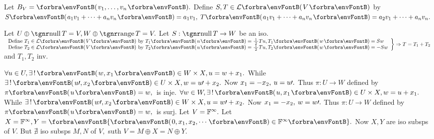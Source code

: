 Let $B_V=\Par{v_1,\dots,v_n}.$ \parSol{}
Define $S,T\in\Lm{V}$ by $S\Par{a_1 v_1+\dots+a_n v_n}=a_1 v_1,\;T\Par{a_1 v_1+\dots+a_n v_n}=a_2 v_1+\dots+a_n v_n.$\PfEnd
\SepLine

Let $U\oplus\null T=V,W\oplus\range T=V.$ Let $S:\null T\rightarrow W$ be an iso.\parSol{}
\hspace{-6pt}$\MathRightBrace{l}{$Define $T_1\in\Lm{V}$ by $T_1\Par{u}=\frac{\;1\;}{2}Tu,T_1\Par{w}=Sw\\$Define $T_2\in\Lm{V}$ by $T_2\Par{u}=\frac{\;1\;}{2}Tu,T_2\Par{w}=-Sw}\Rightarrow T=T_1+T_2$ and $T_1,T_2$ inv.\PfEnd
\SepLine

$\forall u\in U,\exists\,!\,\Par{w,x_1}\in W\times X,u=w+x_1.$ While $\exists\,!\,\Par{u\apostrophe,x_2}\in U\times X,w=u\apostrophe+x_2.$\parSol{}
Now $x_1=-x_2,\:u=u\prime.$ Thus $\pi:U\rightarrow W$ defined by $\pi\Par{u}=w,$ \,is inje.\parSol{\vspace{3pt}}
$\forall w\in W,\exists\,!\,\Par{u,x_1}\in U\times X,w=u+x_1.$ While $\exists\,!\,\Par{w\apostrophe,x_2}\in W\times X,u=w\apostrophe+x_2.$\parSol{}
Now $x_1=-x_2,\:w=w\prime.$ Thus $\pi:U\rightarrow W$ defined by $\pi\Par{u}=w,$ \,is surj.\PfEnd\vspace{4pt}
\AComm Let $V={\mathbb{F}}^{\infty}.$ Let $X=\Fbb^{\infty},Y=\Bra{\Par{0,x_1,x_2,\cdots}\in\Fbb^{\infty}}.$ Now $X,Y$ are iso subsps of $V.$\parCom
But $\nexists$ iso subsps $M,N$ of $V,$ suth $V=M\oplus X=N\oplus Y.$
\SepLine

